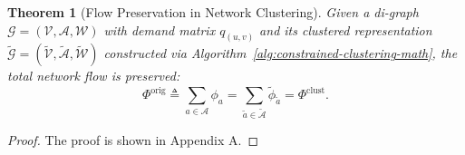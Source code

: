 \documentclass[lettersize,journal]{IEEEtran}
\newtheorem{theorem}{\normalfont\textbf{Theorem}}
\begin{document}

\begin{theorem}[Flow Preservation in Network Clustering]
\label{thm:flow_preservation}
Given a di-graph $\mathcal{G} = (\mathcal{V}, \mathcal{A}, \mathcal{W})$ with demand matrix $q_{(u,v)}$ and its clustered representation $\tilde{\mathcal{G}} = (\tilde{\mathcal{V}}, \tilde{\mathcal{A}}, \tilde{\mathcal{W}})$ constructed via Algorithm~\ref{alg:constrained-clustering-math}, the total network flow is preserved:
\[
\Phi^{\text{orig}} \triangleq \sum_{a \in \mathcal{A}} \phi_a
= \sum_{\tilde{a} \in \tilde{\mathcal{A}}} \tilde{\phi}_{\tilde{a}}
= \Phi^{\text{clust}}.
\]
\end{theorem}

\begin{proof}
The proof is shown in Appendix A.
\end{proof}
\end{document}
